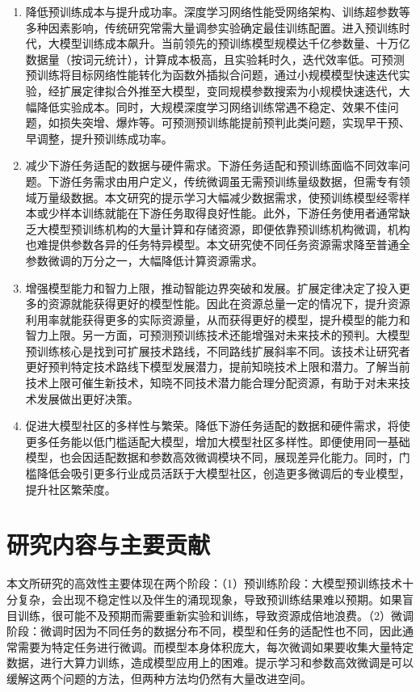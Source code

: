 \begin{enumerate}
  \item 降低预训练成本与提升成功率。深度学习网络性能受网络架构、训练超参数等多种因素影响，传统研究常需大量调参实验确定最佳训练配置。进入预训练时代，大模型训练成本飙升。当前领先的预训练模型规模达千亿参数量、十万亿数据量（按词元统计），计算成本极高，且实验耗时久，迭代效率低。可预测预训练将目标网络性能转化为函数外插拟合问题，通过小规模模型快速迭代实验，经扩展定律拟合外推至大模型，变同规模参数搜索为小规模快速迭代，大幅降低实验成本。同时，大规模深度学习网络训练常遇不稳定、效果不佳问题，如损失突增、爆炸等。可预测预训练能提前预判此类问题，实现早干预、早调整，提升预训练成功率。
  \item 减少下游任务适配的数据与硬件需求。下游任务适配和预训练面临不同效率问题。下游任务需求由用户定义，传统微调虽无需预训练量级数据，但需专有领域万量级数据。本文研究的提示学习大幅减少数据需求，使预训练模型经零样本或少样本训练就能在下游任务取得良好性能。此外，下游任务使用者通常缺乏大模型预训练机构的大量计算和存储资源，即便依靠预训练机构微调，机构也难提供参数各异的任务特异模型。本文研究使不同任务资源需求降至普通全参数微调的万分之一，大幅降低计算资源需求。
  \item 增强模型能力和智力上限，推动智能边界突破和发展。扩展定律决定了投入更多的资源就能获得更好的模型性能。因此在资源总量一定的情况下，提升资源利用率就能获得更多的实际资源量，从而获得更好的模型，提升模型的能力和智力上限。另一方面，可预测预训练技术还能增强对未来技术的预判。大模型预训练核心是找到可扩展技术路线，不同路线扩展斜率不同。该技术让研究者更好预判特定技术路线下模型发展潜力，提前知晓技术上限和潜力。了解当前技术上限可催生新技术，知晓不同技术潜力能合理分配资源，有助于对未来技术发展做出更好决策。
  \item 促进大模型社区的多样性与繁荣。降低下游任务适配的数据和硬件需求，将使更多任务能以低门槛适配大模型，增加大模型社区多样性。即便使用同一基础模型，也会因适配数据和参数高效微调模块不同，展现差异化能力。同时，门槛降低会吸引更多行业成员活跃于大模型社区，创造更多微调后的专业模型，提升社区繁荣度。
\end{enumerate}


\section{研究内容与主要贡献}
本文所研究的高效性主要体现在两个阶段：（1）预训练阶段：大模型预训练技术十分复杂，会出现不稳定性以及伴生的涌现现象，导致预训练结果难以预期。如果盲目训练，很可能不及预期而需要重新实验和训练，导致资源成倍地浪费。（2）微调阶段：微调时因为不同任务的数据分布不同，模型和任务的适配性也不同，因此通常需要为特定任务进行微调。而模型本身体积庞大，每次微调如果要收集大量特定数据，进行大算力训练，造成模型应用上的困难。提示学习和参数高效微调是可以缓解这两个问题的方法，但两种方法均仍然有大量改进空间。

